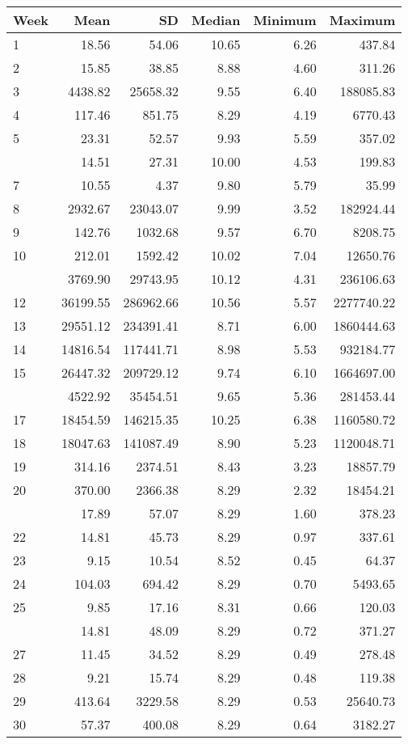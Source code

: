 \documentclass[10pt,letterpaper]{article}
\begin{document}
\begin{tabular}{lrrrrr}
\toprule
Week & Mean & SD & Median & Minimum & Maximum\\
\midrule
1 & 18.56 & 54.06 & 10.65 & 6.26 & 437.84\\
2 & 15.85 & 38.85 & 8.88 & 4.60 & 311.26\\
3 & 4438.82 & 25658.32 & 9.55 & 6.40 & 188085.83\\
4 & 117.46 & 851.75 & 8.29 & 4.19 & 6770.43\\
5 & 23.31 & 52.57 & 9.93 & 5.59 & 357.02\\
\addlinespace
6 & 14.51 & 27.31 & 10.00 & 4.53 & 199.83\\
7 & 10.55 & 4.37 & 9.80 & 5.79 & 35.99\\
8 & 2932.67 & 23043.07 & 9.99 & 3.52 & 182924.44\\
9 & 142.76 & 1032.68 & 9.57 & 6.70 & 8208.75\\
10 & 212.01 & 1592.42 & 10.02 & 7.04 & 12650.76\\
\addlinespace
11 & 3769.90 & 29743.95 & 10.12 & 4.31 & 236106.63\\
12 & 36199.55 & 286962.66 & 10.56 & 5.57 & 2277740.22\\
13 & 29551.12 & 234391.41 & 8.71 & 6.00 & 1860444.63\\
14 & 14816.54 & 117441.71 & 8.98 & 5.53 & 932184.77\\
15 & 26447.32 & 209729.12 & 9.74 & 6.10 & 1664697.00\\
\addlinespace
16 & 4522.92 & 35454.51 & 9.65 & 5.36 & 281453.44\\
17 & 18454.59 & 146215.35 & 10.25 & 6.38 & 1160580.72\\
18 & 18047.63 & 141087.49 & 8.90 & 5.23 & 1120048.71\\
19 & 314.16 & 2374.51 & 8.43 & 3.23 & 18857.79\\
20 & 370.00 & 2366.38 & 8.29 & 2.32 & 18454.21\\
\addlinespace
21 & 17.89 & 57.07 & 8.29 & 1.60 & 378.23\\
22 & 14.81 & 45.73 & 8.29 & 0.97 & 337.61\\
23 & 9.15 & 10.54 & 8.52 & 0.45 & 64.37\\
24 & 104.03 & 694.42 & 8.29 & 0.70 & 5493.65\\
25 & 9.85 & 17.16 & 8.31 & 0.66 & 120.03\\
\addlinespace
26 & 14.81 & 48.09 & 8.29 & 0.72 & 371.27\\
27 & 11.45 & 34.52 & 8.29 & 0.49 & 278.48\\
28 & 9.21 & 15.74 & 8.29 & 0.48 & 119.38\\
29 & 413.64 & 3229.58 & 8.29 & 0.53 & 25640.73\\
30 & 57.37 & 400.08 & 8.29 & 0.64 & 3182.27\\
\bottomrule
\end{tabular}
\end{document}
